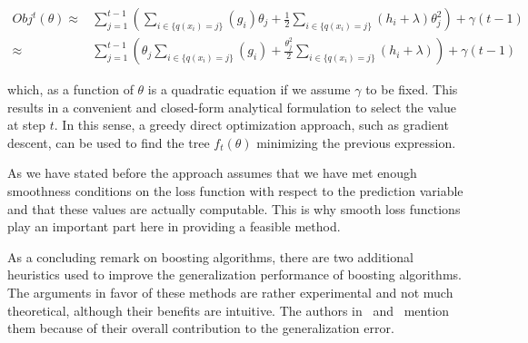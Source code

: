 \begin{equation}\label{eq:gb-objSteps2}
\begin{split}
Obj^t(\theta) \approx & \sum_{j=1}^{t-1} \left( \sum_{i \in \{q(x_i)=j\}} (g_i )\theta_{j} + \frac{1}{2} \sum_{i \in \{q(x_i)=j\}} (h_i + \lambda ) \theta_{j}^2 \right) + \gamma ({t-1}) \\
\approx & \sum_{j=1}^{t-1} \left( \theta_{j}\sum_{i \in \{q(x_i)=j\}} (g_i ) + \frac{\theta_{j}^2}{2} \sum_{i \in \{q(x_i)=j\}} (h_i + \lambda ) \right) + \gamma ({t-1})
\end{split}
\end{equation}

which, as a function of $\theta$ is a quadratic equation if we assume $\gamma$ to be fixed. This results in a convenient and closed-form analytical formulation to select the value at step $t$. In this sense, a greedy direct optimization approach, such as gradient descent, can be used to find the tree $f_t(\theta)$ minimizing the previous expression.

As we have stated before the approach assumes that we have met enough smoothness conditions on the loss function with respect to the prediction variable
and that these values are actually computable. This is why smooth loss functions play an important part here in providing a feasible method.





As a concluding remark on boosting algorithms, there are two additional heuristics used to improve the generalization performance of boosting algorithms. The arguments in favor of these methods are rather experimental and not much theoretical, although their benefits are intuitive. The authors in~\cite{hastie-elemstatslearn} and~\cite{bishop-patternRecognition} mention them because of their overall contribution to the generalization error.

